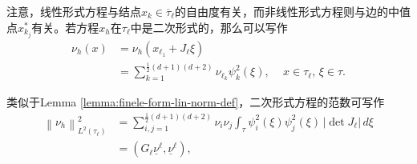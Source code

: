注意，线性形式方程与结点$x_{k} \in \overline{\tau}_{\ell}$的自由度有关，而非线性形式方程则与边的中值点$x_{k_{j}}^{*}$有关。若方程$x_{h}$在$\tau_{\ell}$中是二次形式的，那么可以写作
\begin{equation}
  \label{eq:finele-form-quadratic}
  \begin{split}
    \nu_{h}(x)
    & = \nu_{h} \left( x_{\ell_{1}} + J_{\ell} \xi \right) \\
    & = \sum_{k=1}^{\frac{1}{2} \left( d+1 \right)\left( d+2 \right)}
    \nu_{\ell_{k}} \psi_{k}^{2}(\xi), \quad \, x \in \tau_{\ell}, \, \xi \in \tau.
  \end{split}
\end{equation}

类似于Lemma \ref{lemma:finele-form-lin-norm-def}，二次形式方程的范数可写作
\begin{equation*}
  \begin{split}
  \left\| \nu_{h} \right\|_{L^{2}(\tau_{\ell})}^{2}
  & = \sum_{i,j=1}^{\frac{1}{2} \left( d+1 \right) \left( d+2 \right)}
  \nu_{i} \nu_{j}
  \int_{\tau} \psi_{i}^{2}(\xi) \psi_{j}^{2}(\xi) \, \left| \det J_{\ell} \right| \, d \xi \\
  & = \left( G_{\ell} \underline{\nu}^{\ell}, \underline{\nu}^{\ell} \right),
\end{split}
\end{equation*}
